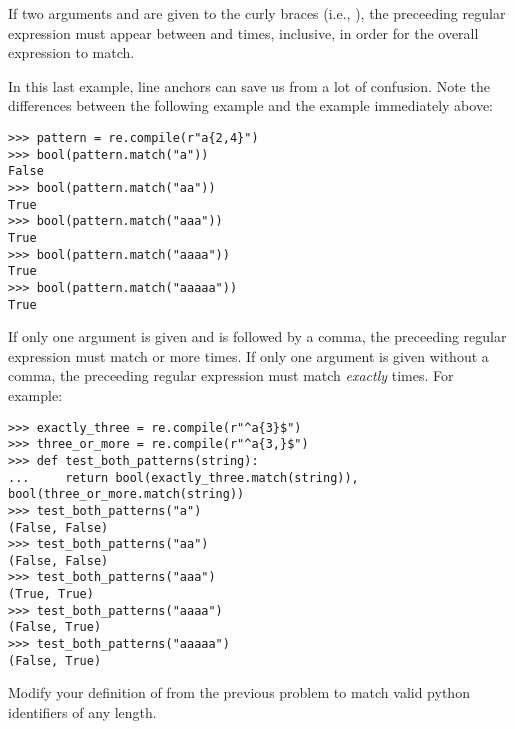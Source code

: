 If two arguments  and  are given to the curly braces (i.e., ), the preceeding regular expression must appear between  and  times, inclusive, in order for the overall expression to match.

\begin{warn}
In this last example, line anchors can save us from a lot of confusion. Note the differences between the following example and the example immediately above:
\begin{lstlisting}
>>> pattern = re.compile(r"a{2,4}")
>>> bool(pattern.match("a"))
False
>>> bool(pattern.match("aa"))
True
>>> bool(pattern.match("aaa"))
True
>>> bool(pattern.match("aaaa"))
True
>>> bool(pattern.match("aaaaa"))
True
\end{lstlisting}
\end{warn}

If only one argument  is given and is followed by a comma, the preceeding regular expression must match  or more times. If only one argument  is given without a comma, the preceeding regular expression must match \emph{exactly}  times.
For example:
\begin{lstlisting}
>>> exactly_three = re.compile(r"^a{3}$")
>>> three_or_more = re.compile(r"^a{3,}$")
>>> def test_both_patterns(string):
...     return bool(exactly_three.match(string)), bool(three_or_more.match(string))
>>> test_both_patterns("a")
(False, False)
>>> test_both_patterns("aa")
(False, False)
>>> test_both_patterns("aaa")
(True, True)
>>> test_both_patterns("aaaa")
(False, True)
>>> test_both_patterns("aaaaa")
(False, True)
\end{lstlisting}

\begin{problem}
Modify your definition of  from the previous problem to match valid python identifiers of any length.
\end{problem}


